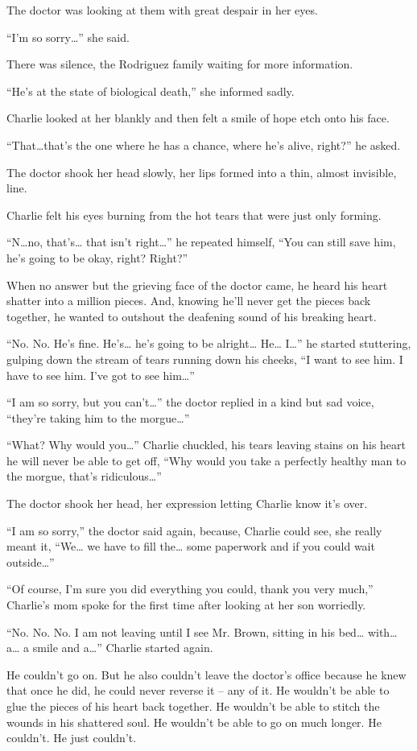 The doctor was looking at them with great despair in her eyes.

“I'm so sorry…” she said.

There was silence, the Rodriguez family waiting for more information.

“He's at the state of biological death,” she informed sadly.

Charlie looked at her blankly and then felt a smile of hope etch onto his face.

“That…that's the one where he has a chance, where he's alive, right?” he asked.

The doctor shook her head slowly, her lips formed into a thin, almost invisible, line.

Charlie felt his eyes burning from the hot tears that were just only forming.

“N…no, that's… that isn't right…” he repeated himself, “You can still save him, he's going to be okay, right? Right?”

When no answer but the grieving face of the doctor came, he heard his heart shatter into a million pieces. And, knowing he'll never get the pieces back together, he wanted to outshout the deafening sound of his breaking heart.

“No. No. He's fine. He's… he's going to be alright… He… I…” he started stuttering, gulping down the stream of tears running down his cheeks, “I want to see him. I have to see him. I've got to see him…”

“I am so sorry, but you can't…” the doctor replied in a kind but sad voice, “they're taking him to the morgue…”

“What? Why would you…” Charlie chuckled, his tears leaving stains on his heart he will never be able to get off, “Why would you take a perfectly healthy man to the morgue, that's ridiculous…”

The doctor shook her head, her expression letting Charlie know it's over.

“I am so sorry,” the doctor said again, because, Charlie could see, she really meant it, “We… we have to fill the… some paperwork and if you could wait outside…”

“Of course, I'm sure you did everything you could, thank you very much,” Charlie's mom spoke for the first time after looking at her son worriedly.

“No. No. No. I am not leaving until I see Mr. Brown, sitting in his bed… with… a… a smile and a…” Charlie started again.

He couldn't go on. But he also couldn't leave the doctor's office because he knew that once he did, he could never reverse it – any of it. He wouldn't be able to glue the pieces of his heart back together. He wouldn't be able to stitch the wounds in his shattered soul. He wouldn't be able to go on much longer. He couldn't. He just couldn't.

